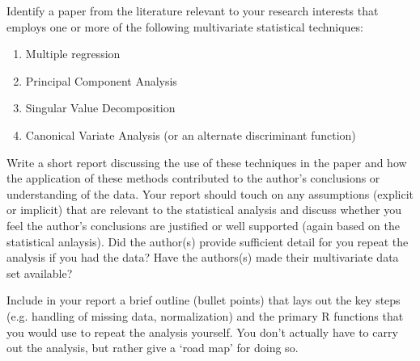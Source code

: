 \medskip
\begin{assignment}
\small

Identify a paper from the literature relevant to your research interests that employs one or more of the following multivariate statistical techniques:

\begin{enumerate}
\item Multiple regression
\item Principal Component Analysis
\item Singular Value Decomposition
\item Canonical Variate Analysis (or an alternate discriminant function)
\end{enumerate}

Write a short report discussing the use of these techniques in the paper and how the application of these methods contributed to the author's conclusions or understanding of the data.  Your report should touch on any assumptions (explicit or implicit) that are relevant to the statistical analysis and discuss whether you feel the author's conclusions are justified or well supported (again based on the statistical anlaysis).  Did the author(s) provide sufficient detail for you repeat the analysis if you had the data?  Have the authors(s) made their multivariate data set available?

\medskip
Include in your report a brief outline (bullet points) that lays out the key steps (e.g. handling of missing data, normalization) and the primary R functions that you would use to repeat the analysis yourself. You don't actually have to carry out the analysis, but rather give a `road map' for doing so.


\end{assignment}


